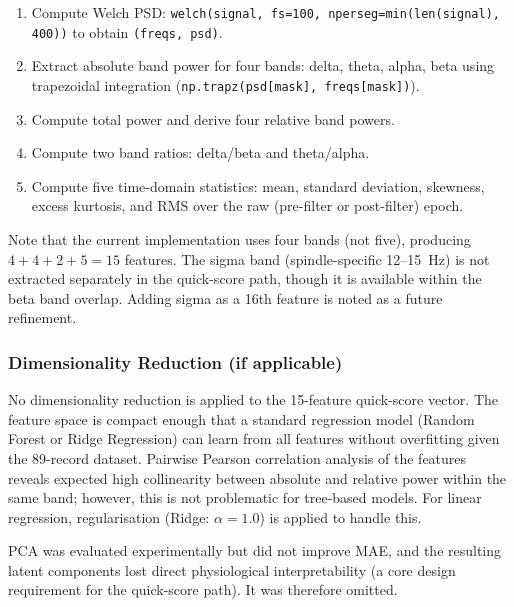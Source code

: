 \documentclass[10pt]{article}
\begin{document}
\begin{enumerate}
  \item Compute Welch PSD: \texttt{welch(signal, fs=100, nperseg=min(len(signal), 400))} to obtain \texttt{(freqs, psd)}.
  \item Extract absolute band power for four bands: delta, theta, alpha, beta using trapezoidal integration (\texttt{np.trapz(psd[mask], freqs[mask])}).
  \item Compute total power and derive four relative band powers.
  \item Compute two band ratios: delta/beta and theta/alpha.
  \item Compute five time-domain statistics: mean, standard deviation, skewness, excess kurtosis, and RMS over the raw (pre-filter or post-filter) epoch.
\end{enumerate}

Note that the current implementation uses four bands (not five), producing $4 + 4 + 2 + 5 = 15$ features. The sigma band (spindle-specific 12--15~Hz) is not extracted separately in the quick-score path, though it is available within the beta band overlap. Adding sigma as a 16th feature is noted as a future refinement.

\subsubsection{Dimensionality Reduction (if applicable)}
\label{sec:dimensionalityReduction}

No dimensionality reduction is applied to the 15-feature quick-score vector. The feature space is compact enough that a standard regression model (Random Forest or Ridge Regression) can learn from all features without overfitting given the 89-record dataset. Pairwise Pearson correlation analysis of the features reveals expected high collinearity between absolute and relative power within the same band; however, this is not problematic for tree-based models. For linear regression, regularisation (Ridge: $\alpha = 1.0$) is applied to handle this.

PCA was evaluated experimentally but did not improve MAE, and the resulting latent components lost direct physiological interpretability (a core design requirement for the quick-score path). It was therefore omitted.

\end{document}
